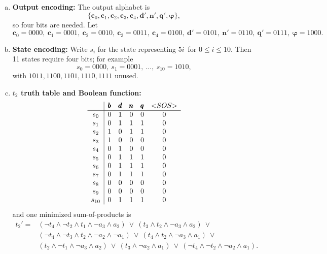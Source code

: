 \begin{enumerate}[{7.}1.]
\begin{enumerate}[(a)]
  \item \textbf{Output encoding:} The output alphabet is
  \[
    \{\pmb{c}_0,\pmb{c}_1,\pmb{c}_2,\pmb{c}_3,\pmb{c}_4,\pmb{d'},\pmb{n'},
    \pmb{q'},\pmb{\varphi}\},
  \]
  so four bits are needed.  Let
  \[
    \pmb{c}_0=0000,\ \pmb{c}_1=0001,\ \pmb{c}_2=0010,\ \pmb{c}_3=0011,\ 
    \pmb{c}_4=0100,\ \pmb{d'}=0101,\ \pmb{n'}=0110,\ \pmb{q'}=0111,\ 
    \pmb{\varphi}=1000.
  \]

  \item \textbf{State encoding:} Write $s_i$ for the state representing
  $5i$\cent\ for $0\leq i\leq 10$.  Then 11 states require four bits; for
  example
  \[
    s_0=0000,\ s_1=0001,\ \ldots,\ s_{10}=1010,
  \]
  with $1011,1100,1101,1110,1111$ unused.

  \item \textbf{$t_2$ truth table and Boolean function:}
  \[
  \begin{array}{c|ccccc}
  & \pmb{b} & \pmb{d} & \pmb{n} & \pmb{q} & \text{\textless}SOS\text{\textgreater} \\
  \hline
  s_0   & 0&1&0&0&0\\
  s_1   & 0&1&1&1&0\\
  s_2   & 1&0&1&1&0\\
  s_3   & 1&0&0&0&0\\
  s_4   & 0&1&0&0&0\\
  s_5   & 0&1&1&1&0\\
  s_6   & 0&1&1&1&0\\
  s_7   & 0&1&1&1&0\\
  s_8   & 0&0&0&0&0\\
  s_9   & 0&0&0&0&0\\
  s_{10}& 0&1&1&1&0
  \end{array}
  \]
  and one minimized sum-of-products is
  \[
  \begin{aligned}
  t_2'={}&(\neg t_4\wedge \neg t_2\wedge t_1\wedge \neg a_3\wedge a_2)\ \vee\
          (t_3\wedge t_2\wedge \neg a_3\wedge a_2)\ \vee\\
        &(\neg t_4\wedge \neg t_3\wedge t_2\wedge \neg a_2\wedge \neg a_1)\ \vee\
          (t_4\wedge t_2\wedge \neg a_3\wedge a_1)\ \vee\\
        &(t_2\wedge \neg t_1\wedge \neg a_3\wedge a_2)\ \vee\
          (t_3\wedge \neg a_2\wedge a_1)\ \vee\
          (\neg t_4\wedge \neg t_2\wedge \neg a_2\wedge a_1).
  \end{aligned}
  \]


\end{enumerate}
\end{enumerate}
